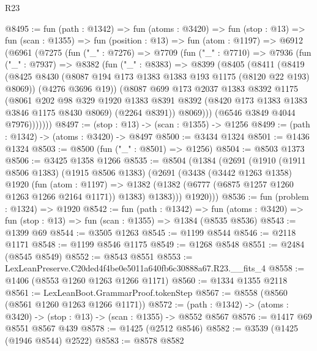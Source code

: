 \begin{lexlean}{R23}
\begin{coremodule}
@8495 := fun (path : @1342) =>
  fun (atoms : @3420) =>
  fun (stop : @13) =>
  fun (scan : @1355) =>
  fun (position : @13) =>
  fun (atom : @1197) =>
  @6912
    (@6961
      (@7275
        (fun ("_" : @7276) =>
        @7709
          (fun ("_" : @7710) =>
          @7936
            (fun ("_" : @7937) =>
            @8382
              (fun ("_" : @8383) =>
              @8399
                (@8405
                  (@8411
                    (@8419
                      (@8425 @8430 (@8087 @194 @173 @1383 @1383 @193 @1175 (@8120 @22 @193) @8069))
                      (@4276 @3696 @19))
                    (@8087
                      @699
                      @173
                      @2037
                      @1383
                      @8392
                      @1175
                      (@8061
                        @202
                        @98
                        @329
                        @1920
                        @1383
                        @8391
                        @8392
                        (@8420 @173 @1383 @1383 @3846 @1175 @8430 @8069)
                        (@2264 @8391))
                      @8069)))
                (@6546 @3849 @4044 @7976)))))))
@8497 := (stop : @13) -> (scan : @1355) -> @1256
@8499 := (path : @1342) -> (atoms : @3420) -> @8497
@8500 := @3434 @1324
@8501 := @1436 @1324
@8503 := @8500 (fun ("_" : @8501) => @1256)
@8504 := @8503 @1373
@8506 := @3425 @1358 @1266
@8535 := @8504
    (@1384
      (@2691
        (@1910
          (@1911 @8506 @1383)
          (@1915 @8506 @1383)
          (@2691
            (@3438
              (@3442 @1263 @1358)
              @1920
              (fun (atom : @1197) =>
              @1382 (@1382 (@6777 (@6875 @1257 @1260 @1263 @1266 @2164 @1171)) @1383) @1383)))
          @1920)))
@8536 := fun (problem : @1324) => @1920
@8542 := fun (path : @1342) =>
  fun (atoms : @3420) => fun (stop : @13) => fun (scan : @1355) => @1384 (@8535 @8536)
@8543 := @1399 @69
@8544 := @3505 @1263
@8545 := @1199 @8544
@8546 := @2118 @1171
@8548 := @1199 @8546 @1175
@8549 := @1268 @8548
@8551 := @2484 (@8545 @8549)
@8552 := @8543 @8551
@8553 := LexLeanPreserve.C20ded4f4be0e5011a640fb6c30888a67.R23.__fits_4
@8558 := @1406 (@8553 @1260 @1263 @1266 @1171)
@8560 := @1334 @1355 @2118
@8561 := LexLeanBoot.GrammarProof.tokenStep
@8567 := @8558 (@8560 (@8561 @1260 @1263 @1266 @1171))
@8572 := (path : @1342) -> (atoms : @3420) -> (stop : @13) -> (scan : @1355) -> @8552 @8567
@8576 := @1417 @69 @8551 @8567 @439
@8578 := @1425 (@2512 @8546)
@8582 := @3539 (@1425 (@1946 @8544) @2522)
@8583 := @8578 @8582

\end{coremodule}
\end{lexlean}

